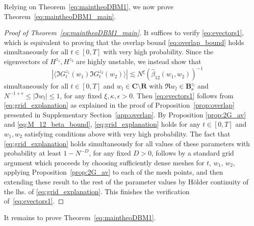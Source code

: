 \documentclass[10pt]{amsart}
\numberwithin{equation}{section}
\newcommand{\R}{\mathbf{R}}
\newcommand{\C}{\mathbf{C}}
\begin{document}
Relying on Theorem~\ref{eq:maintheoDBM1}, we now prove Theorem~\ref{eq:maintheoDBM1_main}.
\begin{proof}[Proof of Theorem~\ref{eq:maintheoDBM1_main}] It suffices to verify \eqref{eq:evectors1}, which is equivalent to proving that the overlap bound \eqref{eq:overlap_bound} holds simultaneously for all $t\in [0,T]$ with very high probability. Since the eigenvectors of $H^{z_1}, H^{z_2}$ are highly unstable, we instead show that
\begin{equation}
\left\vert\langle \Im G^{z_1}_t(w_1)\Im G^{z_2}_t(w_2)\rangle\right\vert \lesssim N^\xi \left(\widehat{\beta}_{12}(w_1,w_2)\right)^{-1}
\label{eq:grid_explanation}
\end{equation}
simultaneously for all $t\in [0,T]$ and $w_l\in \C\setminus\R$ with $\Re w_l\in\mathbf{B}_\kappa^{z_l}$ and $N^{-1+\epsilon}\le |\Im w_l|\le 1$, for any fixed $\xi,\kappa,\epsilon>0$. Then \eqref{eq:evectors1} follows from \eqref{eq:grid_explanation} as explained in the proof of Proposition~\ref{prop:overlap} presented in Supplementary Section~\ref{app:overlap}. By Proposition \ref{prop:2G_av} and \eqref{eq:M_12_beta_bound}, \eqref{eq:grid_explanation} holds for any $t\in [0,T]$ and $w_1,w_2$ satisfying conditions above with very high probability. The fact that \eqref{eq:grid_explanation} holds simultaneously for all values of these parameters with probability at least $1-N^{-D}$, for any fixed $D>0$, follows by a standard grid argument which proceeds by choosing sufficiently dense meshes for $t$, $w_1$, $w_2$, applying Proposition~\ref{prop:2G_av} to each of the mesh points, and then extending these result to the rest of the parameter values by H\"older continuity of the lhs. of \eqref{eq:grid_explanation}. This finishes the verification of~\eqref{eq:evectors1}.
\end{proof}

It remains to prove Theorem~\ref{eq:maintheoDBM1}.
\end{document}
